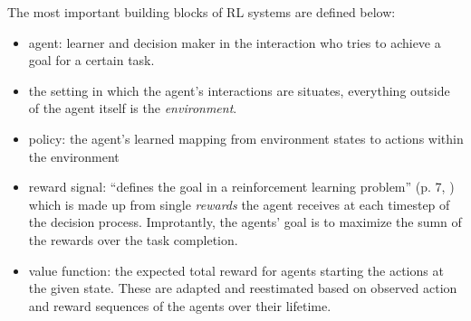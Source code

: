 The most important building blocks of RL systems are defined below:
\begin{itemize}
	\item agent: learner and decision maker in the interaction who tries to achieve a goal for a certain task.
	\item the setting in which the agent's interactions are situates, everything outside of the agent itself is the \textit{environment}.
	\item policy: the agent's learned mapping from environment states to actions within the environment 
	\item reward signal: ``defines the goal in a reinforcement learning problem'' (p. 7, \cite{sutton2018reinforcement}) which is made up from single \textit{rewards} the agent receives at each timestep of the decision process. Improtantly, the agents' goal is to maximize the sumn of the rewards over the task completion.
	\item value function: the expected total reward for agents starting the actions at the given state. These are adapted and reestimated based on observed action and reward sequences of the agents over their lifetime. 
\end{itemize}

